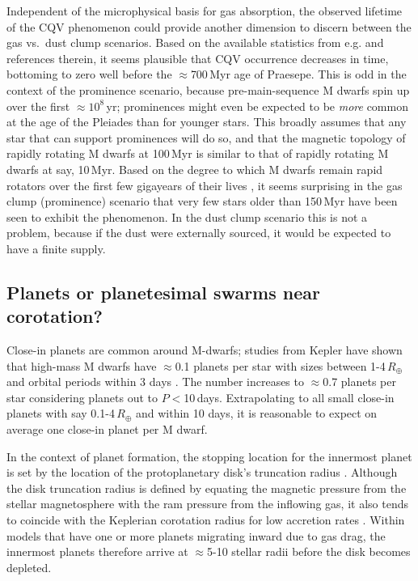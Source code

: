 \documentclass[11pt,twocolumn,tighten]{aastex63}
\begin{document}
Independent of the microphysical basis for gas absorption, the
observed lifetime of the CQV phenomenon could provide another
dimension to discern between the gas vs.~dust clump scenarios.
Based on the available statistics from e.g.
\citet{2022AJ....164...80R} and references therein, it seems plausible
that CQV occurrence decreases in time, bottoming to zero well before
the $\approx$700\,Myr age of Praesepe.  This is odd in the context of
the prominence scenario, because pre-main-sequence M dwarfs spin up
over the first $\approx$$10^8$\,yr; prominences might even be expected
to be {\it more} common at the age of the Pleiades than for younger
stars.  This broadly assumes that any star that can support
prominences will do so, and that the magnetic topology of rapidly
rotating M dwarfs at 100\,Myr is similar to that of rapidly rotating M
dwarfs at say, 10\,Myr.  Based on the degree to which M dwarfs remain
rapid rotators over the first few gigayears of their lives
\citep[e.g.][]{2022AJ....164...80R,2022ApJ...936..109P}, it seems
surprising in the gas clump (prominence) scenario that very few stars
older than 150\,Myr have been seen to exhibit the phenomenon.  In the
dust clump scenario this is not a problem, because if the dust were
externally sourced, it would be expected to have a finite supply.


\subsection{Planets or planetesimal swarms near corotation?}

Close-in planets are common around M-dwarfs; studies from Kepler have
shown that high-mass M dwarfs have $\approx$0.1 planets per star with
sizes between 1-4\,$R_\oplus$ and orbital periods within 3 days
\citep{2015ApJ...807...45D}.  The number increases to $\approx$0.7
planets per star considering planets out to $P$$<$10\,days.
Extrapolating to all small close-in planets with say 0.1-4\,$R_\oplus$
and within 10 days, it is reasonable to expect on average one close-in
planet per M dwarf.

In the context of planet formation, the stopping location for the
innermost planet is set by the location of the protoplanetary disk's
truncation radius \citep{2018haex.bookE.142I}.  Although the disk
truncation radius is defined by equating the magnetic pressure from
the stellar magnetosphere with the ram pressure from the inflowing
gas, it also tends to coincide with the Keplerian corotation radius
for low accretion rates
\citep{2016ARA&A..54..135H,2022MNRAS.510.5246L}.  Within models that
have one or more planets migrating inward due to gas drag, the
innermost planets therefore arrive at $\approx$5-10 stellar radii
before the disk becomes depleted.
\end{document}
